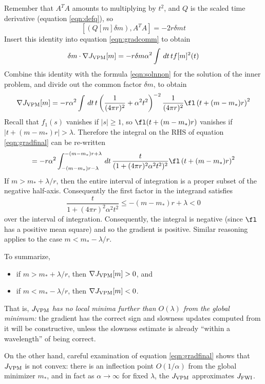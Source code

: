 Remember that $A^TA$ amounts to multiplying by $t^2$, and $Q$ is the scaled time derivative (equation \ref{eqn:defq}), so
\begin{equation}
\label{eqn:comm3}
[(Q[m]\delta m),A^TA]=-2r\delta mt
\end{equation}
Insert this identity into equation \ref{eqn:gradcomm} to obtain
\begin{equation}
\label{eqn:comm4}
\delta m \cdot \nabla J_{\rm VPM}[m] =  -r\delta m \alpha^2\int \,dt\,tf[m]^2(t)
\end{equation}
Combine this identity with the formula \ref{eqn:solnnon} for the
solution of the inner problem, and divide out the common factor
$\delta m $, to obtain
\begin{equation}
\label{eqn:gradfinal}
\nabla J_{\rm VPM}[m] = -r\alpha^2\int \,dt\,t\left(\frac{1}{(4\pi r)^2} + \alpha^2 t^2\right)^{-2}\frac{1}{(4\pi r)^2}\fl\left(t+(m-m_*)r\right)^2
\end{equation}
Recall that $f_1(s)$ vanishes if $|s|\ge 1$, so $\fl(t+(m-m_*)r)$
vanishes if $|t+(m-m_*)r| > \lambda$. Therefore the integral on the
RHS of equation \ref{eqn:gradfinal} can be re-written
\[
  = -r\alpha^2\int_{-(m-m_*)r-\lambda}^{-(m-m_*)r+\lambda}
  \,dt\, \frac{t}{(1+(4\pi r)^2\alpha^2 t^2)^2}\fl\left(t+(m-m_*)r\right)^2
\]
If $m > m_*+\lambda/r$, then the entire interval of integration is a proper
subset of the negative half-axis. Consequently the first factor in the
integrand satisfies
\[
 \frac{t}{1+(4\pi r)^2\alpha^2 t^2}
  \le -(m-m_*)r+\lambda < 0
\]
over the interval of integration. Consequently, the integral is
negative (since $\fl$ has a positive mean square) and so the gradient
is positive. Similar reasoning applies to the case $m <
m_*-\lambda/r$.

To summarize,
\begin{itemize}
\item if $m > m_*+\lambda/r$, then $\nabla J_{\rm VPM}[m] > 0$, and
\item if $m < m_*-\lambda/r$, then $\nabla J_{\rm VPM}[m] < 0$.
\end{itemize}
That is, {\em $J_{\rm VPM}$ has no local minima
  further than  $O(\lambda)$ from the global minimum:} the gradient
has the correct sign and slowness updates computed from it will be
constructive, unless the slowness estimate is already ``within a
wavelength'' of being correct.

On the other hand, careful examination of equation \ref{eqn:gradfinal}
shows that $J_{\rm VPM}$ is not convex: there is an inflection point
$O(1/\alpha)$ from the global minimizer $m_*$, and in fact as $\alpha
\rightarrow \infty$ for fixed $\lambda$, the $J_{\rm VPM}$
approximates $J_{\rm FWI}$. 

